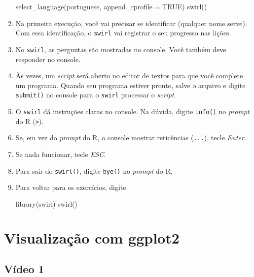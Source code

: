 \documentclass[
  11pt]{report}
\newenvironment{Shaded}{\begin{snugshade}}{\end{snugshade}}
\newcommand{\AttributeTok}[1]{\textcolor[rgb]{0.77,0.63,0.00}{#1}}
\newcommand{\ConstantTok}[1]{\textcolor[rgb]{0.00,0.00,0.00}{#1}}
\newcommand{\FunctionTok}[1]{\textcolor[rgb]{0.00,0.00,0.00}{#1}}
\newcommand{\NormalTok}[1]{#1}
\newcommand{\StringTok}[1]{\textcolor[rgb]{0.31,0.60,0.02}{#1}}
\begin{document}
\begin{enumerate}
\begin{Shaded}
\begin{Highlighting}[]
\FunctionTok{select\_language}\NormalTok{(}\StringTok{\textquotesingle{}portuguese\textquotesingle{}}\NormalTok{, }\AttributeTok{append\_rprofile =} \ConstantTok{TRUE}\NormalTok{)}
\FunctionTok{swirl}\NormalTok{()}
\end{Highlighting}
\end{Shaded}
\item
  Na primeira execução, você vai precisar se identificar (qualquer nome serve). Com essa identificação, o \texttt{swirl} vai registrar o seu progresso nas lições.
\item
  No \texttt{swirl}, as perguntas são mostradas no console. Você também deve responder no console.
\item
  Às vezes, um \emph{script} será aberto no editor de textos para que você complete um programa. Quando seu programa estiver pronto, salve o arquivo e digite \texttt{submit()} no console para o \texttt{swirl} processar o \emph{script}.
\item
  O \texttt{swirl} dá instruções claras no console. Na dúvida, digite \texttt{info()} no \emph{prompt} do R (\texttt{\textgreater{}}).
\item
  Se, em vez do \emph{prompt} do R, o console mostrar reticências (\texttt{...}), tecle \emph{Enter}.
\item
  Se nada funcionar, tecle \emph{ESC}.
\item
  Para sair do \texttt{swirl()}, digite \texttt{bye()} no \emph{prompt} do R.
\item
  Para voltar para os exercícios, digite

\begin{Shaded}
\begin{Highlighting}[]
\FunctionTok{library}\NormalTok{(swirl)}
\FunctionTok{swirl}\NormalTok{()}
\end{Highlighting}
\end{Shaded}
\end{enumerate}

\hypertarget{viz}{%
\chapter{Visualização com ggplot2}\label{viz}}

\hypertarget{vuxeddeo-1-2}{%
\section{Vídeo 1}\label{vuxeddeo-1-2}}
\end{document}
